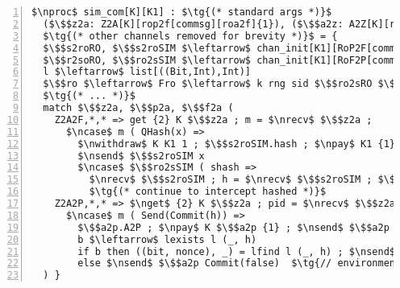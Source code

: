 \centering
\begin{lstlisting}[basicstyle=\scriptsize\BeraMonottFamily, mathescape, frame=single, numbers=left, xleftmargin=2em, xrightmargin=0em]
$\nproc$ sim_com[K][K1] : $\tg{(* standard args *)}$ 
  ($\$$z2a: Z2A[K][rop2f[commsg][roa2f]{1}), ($\$$a2z: A2Z[K][ro2fp[commsg][rof2a]{0}),
  $\tg{(* other channels removed for brevity *)}$ = {
  $\$$s2roRO, $\$$s2roSIM $\leftarrow$ chan_init[K1][RoP2F[commsg]][rop2f[commsg]]
  $\$$r2soRO, $\$$ro2sSIM $\leftarrow$ chan_init[K1][RoF2P[commsg]][rof2p[commsg]]
  l $\leftarrow$ list[((Bit,Int),Int)]
  $\$$ro $\leftarrow$ Fro $\leftarrow$ k rng sid $\$$ro2sRO $\$$s2roRO l
  $\tg{(* ... *)}$
  match $\$$z2a, $\$$p2a, $\$$f2a (
    Z2A2F,*,* => get {2} K $\$$z2a ; m = $\nrecv$ $\$$z2a ;
      $\ncase$ m ( QHash(x) =>
        $\nwithdraw$ K K1 1 ; $\$$s2roSIM.hash ; $\npay$ K1 {1} $\$$s2roSIM ; $\nsend$ $\$$s2roSIM pidS 
        $\nsend$ $\$$s2roSIM x 
        $\ncase$ $\$$ro2sSIM ( shash =>
          $\nrecv$ $\$$s2roSIM ; h = $\nrecv$ $\$$s2roSIM ; $\$$a2z.F2A2Z ; $\nsend$ $\$$a2z RHash(h)
          $\tg{(* continue to intercept hashed *)}$
    Z2A2P,*,* => $\nget$ {2} K $\$$z2a ; pid = $\nrecv$ $\$$z2a ; m = $\nrecv$ $\$$z3a 
      $\ncase$ m ( Send(Commit(h)) =>
        $\$$a2p.A2P ; $\npay$ K $\$$a2p {1} ; $\nsend$ $\$$a2p pidS 
        b $\leftarrow$ lexists l (_, h)
        if b then ((bit, nonce), _) = lfind l (_, h) ; $\nsend$ $\$$a2p Commit(bit)  $\tg{// commitment has preimage}$
        else $\nsend$ $\$$a2p Commit(false)  $\tg{// environment commiting to something that will fail}$
  ) }
\end{lstlisting}
